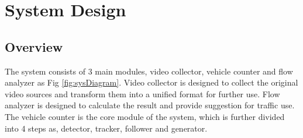 \documentclass[draftclsnofoot,onecolumn]{IEEEtran}
\begin{document}

\section{System Design}
	\subsection{Overview}
	The system consists of 3 main modules, video collector, vehicle counter and flow analyzer as Fig \ref{fig:sysDiagram}. Video collector is designed to collect the original video sources and transform them into a unified format for further use. Flow analyzer is designed to calculate the result and provide suggestion for traffic use. The vehicle counter is the core module of the system, which is further divided into 4 steps as, detector, tracker, follower and generator. 
	
\end{document}
